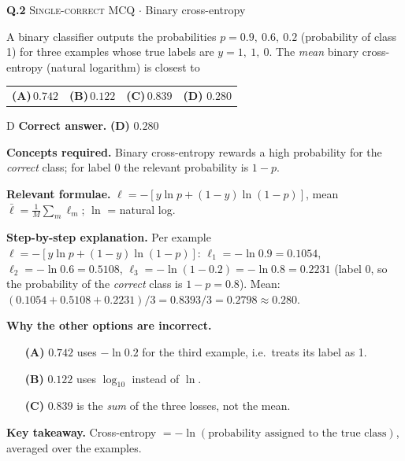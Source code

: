 \documentclass[11pt,a4paper]{article}
\newcommand{\optlabel}[1]{\textbf{(#1)}}
\newcommand{\correctlabel}[1]{\textcolor{okgreen}{\textbf{(#1)}\,\ding{51}}}
\newenvironment{qitem}[1]{\begin{list}{}{\setlength{\leftmargin}{3.3em}\setlength{\labelwidth}{3.1em}%
  \setlength{\labelsep}{0.2em}\setlength{\topsep}{3pt}\setlength{\parsep}{3pt}}\item[\textbf{Q.#1}\hfill]}{\end{list}}
\newcommand{\qsep}{\par\vspace{2pt}{\color{black!15}\hrule}\vspace{4pt}}
\newcommand{\qmeta}[2]{{\footnotesize\color{black!60}\textsc{#1} \;$\cdot$\; #2}\par}
\begin{document}
\begin{qitem}{2}
\qmeta{Single-correct MCQ}{Binary cross-entropy}
A binary classifier outputs the probabilities $p = 0.9,\ 0.6,\ 0.2$ (probability of class 1) for three
examples whose true labels are $y = 1,\ 1,\ 0$. The \emph{mean} binary cross-entropy (natural logarithm) is closest to
\par\smallskip\noindent\begin{tabularx}{\linewidth}{@{}*{4}{L}@{}}
\optlabel{A}\,$0.742$ & \optlabel{B}\,$0.122$ & \optlabel{C}\,$0.839$ & \correctlabel{D}\,$0.280$
\end{tabularx}
\end{qitem}
\begin{solbox}{D}
\textbf{\color{brand}Correct answer.} \textcolor{okgreen}{\textbf{(D)}} $0.280$

\textbf{\color{brand}Concepts required.} Binary cross-entropy rewards a high probability for the \emph{correct} class; for label 0 the relevant probability is $1 - p$.

\textbf{\color{brand}Relevant formulae.} $\ell = -[y\ln p + (1 - y)\ln(1 - p)]$, mean $\bar\ell = \frac1M\sum_m\ell_m$; $\ln$ = natural log.

\textbf{\color{brand}Step-by-step explanation.} Per example $\ell = -[y\ln p + (1-y)\ln(1-p)]$:
$\ell_1 = -\ln 0.9 = 0.1054$, $\ell_2 = -\ln 0.6 = 0.5108$, $\ell_3 = -\ln(1 - 0.2) = -\ln 0.8 = 0.2231$ (label 0, so the
probability of the \emph{correct} class is $1 - p = 0.8$). Mean: $(0.1054 + 0.5108 + 0.2231)/3 = 0.8393/3 = 0.2798 \approx 0.280$.

\textbf{\color{brand}Why the other options are incorrect.}
\begin{itemize}[leftmargin=2.4em, itemsep=1pt, topsep=2pt]
\item[\textbf{(A)}] $0.742$ uses $-\ln 0.2$ for the third example, i.e.\ treats its label as 1.
\item[\textbf{(B)}] $0.122$ uses $\log_{10}$ instead of $\ln$.
\item[\textbf{(C)}] $0.839$ is the \emph{sum} of the three losses, not the mean.
\end{itemize}
\textbf{\color{brand}Key takeaway.} Cross-entropy $= -\ln(\text{probability assigned to the true class})$, averaged over the examples.
\end{solbox}
\qsep
\end{document}
